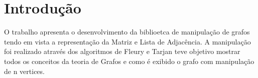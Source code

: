 \chapter{Introdução}
\label{intro}

O trabalho apresenta o desenvolvimento da biblioetca de manipulação de 
grafos tendo em vista a representação da Matriz e Lista de Adjacência. A 
manipulação foi realizado através dos algoritmos de Fleury e Tarjan teve 
objetivo mostrar todos os conceitos da teoria de Grafos e como é exibido o 
grafo com manipulação de n vertices.

